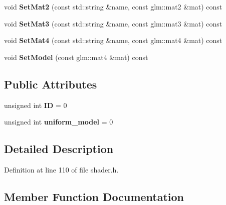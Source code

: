 \begin{DoxyCompactItemize}
\item 
\mbox{\label{classnabla_1_1renderer_1_1_shader_aaab077b0973465535e611db44c20211f}} 
void {\bfseries Set\+Mat2} (const std\+::string \&name, const glm\+::mat2 \&mat) const
\item 
\mbox{\label{classnabla_1_1renderer_1_1_shader_acba7c3525f0f555ad9de422327c6f66f}} 
void {\bfseries Set\+Mat3} (const std\+::string \&name, const glm\+::mat3 \&mat) const
\item 
\mbox{\label{classnabla_1_1renderer_1_1_shader_a1df30f7210849545a0b1cdebbf45abc9}} 
void {\bfseries Set\+Mat4} (const std\+::string \&name, const glm\+::mat4 \&mat) const
\item 
\mbox{\label{classnabla_1_1renderer_1_1_shader_aaa05be8a5db72f0c0359425d4b4b9480}} 
void {\bfseries Set\+Model} (const glm\+::mat4 \&mat) const
\end{DoxyCompactItemize}
\subsection*{Public Attributes}
\begin{DoxyCompactItemize}
\item 
\mbox{\label{classnabla_1_1renderer_1_1_shader_a94d77c60fc5eec46af4078cade20b096}} 
unsigned int {\bfseries ID} = 0
\item 
\mbox{\label{classnabla_1_1renderer_1_1_shader_a460f9adf45f1158c39d024ba433dc272}} 
unsigned int {\bfseries uniform\+\_\+model} = 0
\end{DoxyCompactItemize}


\subsection{Detailed Description}


Definition at line 110 of file shader.\+h.



\subsection{Member Function Documentation}
\mbox{\label{classnabla_1_1renderer_1_1_shader_a0a212b60f4c3cfc26940e2de26561fd9}} 
